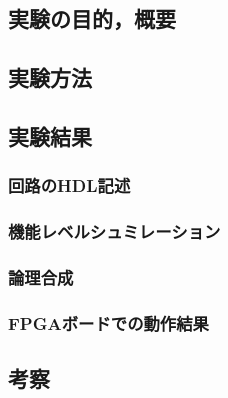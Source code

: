 \documentclass[a4paper,15pt]{jsarticle}
\begin{document}
\subsection{実験の目的，概要}
\subsection{実験方法}
\subsection{実験結果}
\subsubsection{回路のHDL記述}
\subsubsection{機能レベルシュミレーション}
\subsubsection{論理合成}
\subsubsection{FPGAボードでの動作結果}
\subsection{考察}
\end{document}
